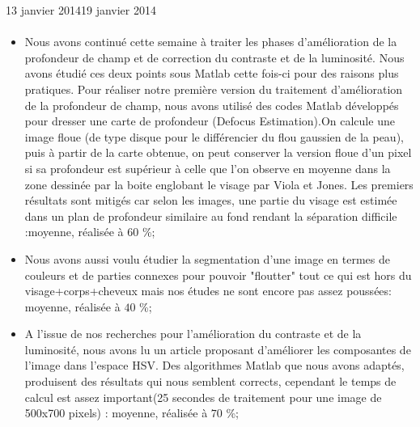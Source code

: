 \documentclass[12pt]{fiche-rd-info}
\begin{document}
\begin{fichesuivi}{13 janvier 2014}{19 janvier 2014}
\paragraph{}
	\begin{travaileffectue}
		\begin{itemize}
			\item Nous avons continué cette semaine à traiter les phases d'amélioration de la profondeur de champ et de correction du contraste et de la luminosité. Nous avons étudié ces deux points sous Matlab cette fois-ci pour des raisons plus pratiques. Pour réaliser notre première version du traitement d'amélioration de la profondeur de champ, nous avons utilisé des codes Matlab développés pour dresser une carte de profondeur (Defocus Estimation).On calcule une image floue (de type disque pour le différencier du flou gaussien de la peau), puis à partir de la carte obtenue, on peut conserver la version floue d'un pixel si sa profondeur est supérieur à celle que l'on observe en moyenne dans la zone dessinée par la boite englobant le visage par Viola et Jones. Les premiers résultats sont mitigés car selon les images, une partie du visage est estimée dans un plan de profondeur similaire au fond rendant la séparation difficile :moyenne, réalisée à $60$ \%;
			\item Nous avons aussi voulu étudier la segmentation d'une image en termes de couleurs et de parties connexes pour pouvoir "floutter" tout ce qui est hors du visage+corps+cheveux mais nos études ne sont encore pas assez poussées: moyenne, réalisée à $40$ \%;
			\item A l'issue de nos recherches pour l'amélioration du contraste et de la luminosité, nous avons lu un article proposant d'améliorer les composantes de l'image dans l'espace HSV. Des algorithmes Matlab que nous avons adaptés, produisent des résultats qui nous semblent corrects, cependant le temps de calcul est assez important(25 secondes de traitement pour une image de 500x700 pixels) : moyenne, réalisée à $70$ \%;
		\end{itemize}
	\end{travaileffectue}


\end{fichesuivi}
\end{document}
